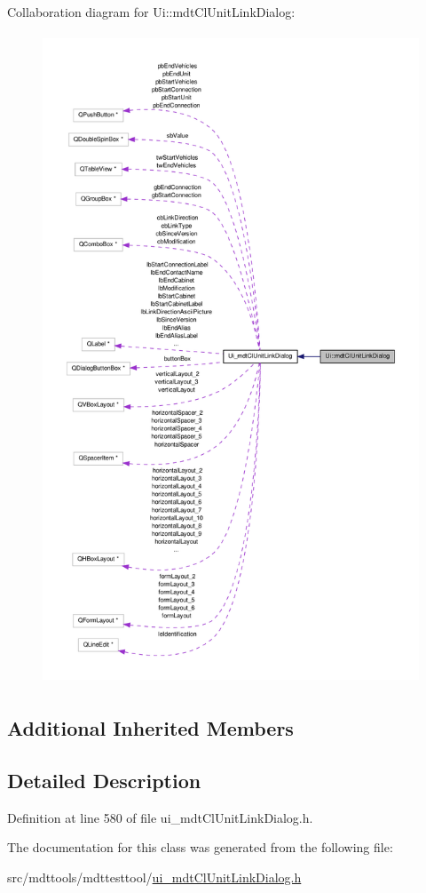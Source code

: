 Collaboration diagram for Ui\-:\-:mdt\-Cl\-Unit\-Link\-Dialog\-:
\nopagebreak
\begin{figure}[H]
\begin{center}
\leavevmode
\includegraphics[height=550pt]{class_ui_1_1mdt_cl_unit_link_dialog__coll__graph}
\end{center}
\end{figure}
\subsection*{Additional Inherited Members}


\subsection{Detailed Description}


Definition at line 580 of file ui\-\_\-mdt\-Cl\-Unit\-Link\-Dialog.\-h.



The documentation for this class was generated from the following file\-:\begin{DoxyCompactItemize}
\item 
src/mdttools/mdttesttool/\hyperlink{ui__mdt_cl_unit_link_dialog_8h}{ui\-\_\-mdt\-Cl\-Unit\-Link\-Dialog.\-h}\end{DoxyCompactItemize}
